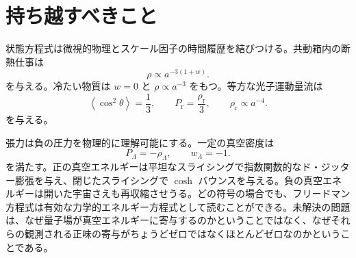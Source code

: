 \begin{classroomqa}
\end{classroomqa}

\begin{classroomqa}
\end{classroomqa}

\section{持ち越すべきこと}

状態方程式は微視的物理とスケール因子の時間履歴を結びつける。共動箱内の断熱仕事は
\[
\rho\propto a^{-3(1+w)}.
\]
を与える。冷たい物質は \(w=0\) と \(\rho\propto a^{-3}\) をもつ。等方な光子運動量流は
\[
\left\langle\cos^2\theta\right\rangle=\frac13,
\qquad
P_{\mathrm r}=\frac{\rho_{\mathrm r}}{3},
\qquad
\rho_{\mathrm r}\propto a^{-4}.
\]
を与える。

張力は負の圧力を物理的に理解可能にする。一定の真空密度は
\[
P_\Lambda=-\rho_\Lambda,
\qquad
w_\Lambda=-1.
\]
を満たす。正の真空エネルギーは平坦なスライシングで指数関数的なド・ジッター膨張を与え、閉じたスライシングで \(\cosh\) バウンスを与える。負の真空エネルギーは開いた宇宙さえも再収縮させうる。どの符号の場合でも、フリードマン方程式は有効な力学的エネルギー方程式として読むことができる。未解決の問題は、なぜ量子場が真空エネルギーに寄与するのかということではなく、なぜそれらの観測される正味の寄与がちょうどゼロではなくほとんどゼロなのかということである。
